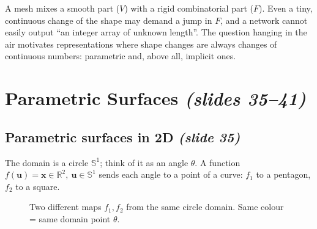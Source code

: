 \documentclass[11pt,a4paper]{article}
\newcommand{\R}{\mathbb{R}}
\newcommand{\Sph}{\mathbb{S}}
\newcommand{\vx}{\bm{x}}
\newcommand{\vu}{\bm{u}}
\theoremstyle{definition}
\theoremstyle{plain}
\theoremstyle{remark}
\newcommand{\slides}[1]{\texorpdfstring{\emph{(#1)}}{(#1)}}
\begin{document}
\begin{intuition}
A mesh mixes a smooth part ($V$) with a rigid combinatorial part ($F$). Even a tiny, continuous change of the shape may demand a jump in $F$, and a network cannot easily output ``an integer array of unknown length''. The question hanging in the air motivates representations where shape changes are always changes of continuous numbers: parametric and, above all, implicit ones.
\end{intuition}

\section{Parametric Surfaces \slides{slides 35--41}}

\subsection{Parametric surfaces in 2D \slides{slide 35}}
The domain is a circle $\Sph^1$; think of it as an angle $\theta$. A function $f(\vu)=\vx\in\R^2,\ \vu\in\Sph^1$ sends each angle to a point of a curve: $f_1$ to a pentagon, $f_2$ to a square.

\begin{figure}[ht]
\centering
{}
\caption{Two different maps $f_1,f_2$ from the same circle domain. Same colour = same domain point $\theta$.}
\end{figure}
\end{document}
